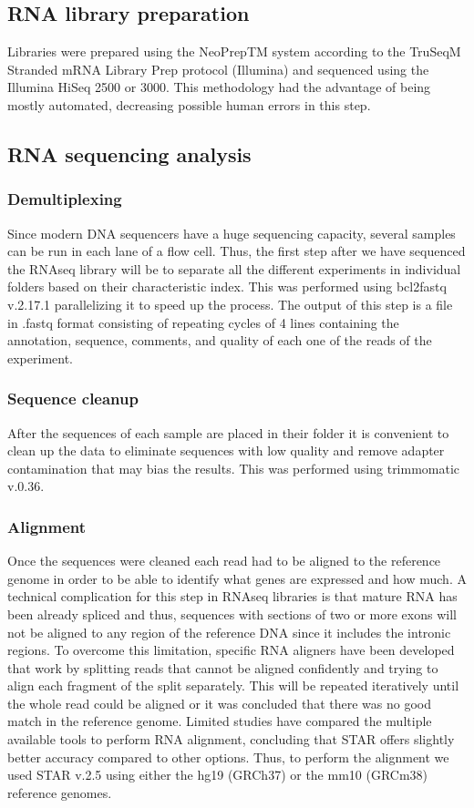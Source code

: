 \subsection{RNA library preparation}
Libraries were prepared using the NeoPrepTM system according to the TruSeqM Stranded mRNA Library Prep protocol (Illumina) and sequenced using the Illumina HiSeq 2500 or 3000. This methodology had the advantage of being mostly automated, decreasing possible human errors in this step.

\subsection{RNA sequencing analysis}
\subsubsection{Demultiplexing}
Since modern DNA sequencers have a huge sequencing capacity, several samples can be run in each lane of a flow cell. Thus, the first step after we have sequenced the RNAseq library will be to separate all the different experiments in individual folders based on their characteristic index. This was performed using bcl2fastq v.2.17.1 parallelizing it to speed up the process. The output of this step is a file in .fastq format consisting of repeating cycles of 4 lines containing the annotation, sequence, comments, and quality of each one of the reads of the experiment.

\subsubsection{Sequence cleanup}
After the sequences of each sample are placed in their folder it is convenient to clean up the data to eliminate sequences with low quality and remove adapter contamination that may bias the results. This was performed using trimmomatic v.0.36.

\subsubsection{Alignment}
Once the sequences were cleaned each read had to be aligned to the reference genome in order to be able to identify what genes are expressed and how much. A technical complication for this step in RNAseq libraries is that mature RNA has been already spliced and thus, sequences with sections of two or more exons will not be aligned to any region of the reference DNA since it includes the intronic regions. To overcome this limitation, specific RNA aligners have been developed that work by splitting reads that cannot be aligned confidently and trying to align each fragment of the split separately. This will be repeated iteratively until the whole read could be aligned or it was concluded that there was no good match in the reference genome.  Limited studies have compared the multiple available tools to perform RNA alignment, concluding that STAR offers slightly better accuracy compared to other options.\cite{Baruzzo2017} Thus, to perform the alignment we used STAR v.2.5 using either the hg19 (GRCh37) or the mm10 (GRCm38) reference genomes.

